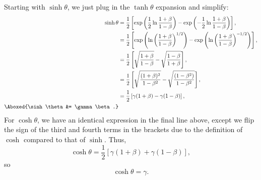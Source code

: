 \begin{parts}
    \item Starting with $\sinh\theta$, we just plug in the $\tanh\theta$ expansion and simplify:
        \begin{align*}
            \sinh\theta &= \frac{1}{2}\left[\exp\left(\frac{1}{2}\ln\frac{1+\beta}{1-\beta}\right) - \exp\left(-\frac{1}{2}\ln\frac{1+\beta}{1-\beta}\right)\right], \\
            &= \frac{1}{2}\left[\exp\left(\ln\left(\frac{1+\beta}{1-\beta}\right)^{1/2}\right) - \exp\left(\ln\left(\frac{1+\beta}{1-\beta}\right)^{-1/2}\right)\right], \\
            &= \frac{1}{2} \left[\sqrt{\frac{1+\beta}{1-\beta}} - \sqrt{\frac{1-\beta}{1+\beta}}\right], \\
            &= \frac{1}{2} \left[\sqrt{\frac{(1+\beta)^2}{1-\beta^2}} - \sqrt{\frac{(1-\beta^2)}{1-\beta^2}}\right], \\
            &= \frac{1}{2}\left[\gamma(1+\beta) - \gamma(1-\beta)\right], \\
            \Aboxed{\sinh\theta &= \gamma\beta.}
        \end{align*}
        For $\cosh\theta$, we have an identical expression in the final line above, except we flip the sign of the third and fourth terms in the brackets due to the definition of $\cosh$ compared to that of $\sinh$. Thus,
        \begin{equation*}
            \cosh\theta = \frac{1}{2}\left[\gamma(1+\beta) + \gamma(1-\beta)\right],
        \end{equation*}
        so
        \begin{equation*}
            \boxed{\cosh\theta = \gamma.}
        \end{equation*}
\end{parts}